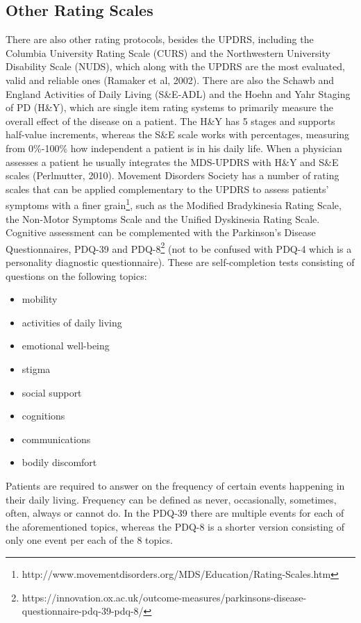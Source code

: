 
\subsection{Other Rating Scales}
\label{subsec:otherScales}
There are also other rating protocols, besides the \gls{UPDRS}, including the Columbia University Rating Scale (CURS) and the Northwestern University Disability Scale (NUDS), which along with the \gls{UPDRS} are the most evaluated, valid and reliable ones (Ramaker et al, 2002). There are also the Schawb and England Activities of Daily Living (S\&E-ADL) and the Hoehn and Yahr Staging of \gls{PD} (H\&Y), which are single item rating systems to primarily measure the overall effect of the disease on a patient. The H\&Y has 5 stages and supports half-value increments, whereas the S\&E scale works with percentages, measuring from 0\%-100\% how independent a patient is in his daily life. When a physician assesses a patient he usually integrates the MDS-\gls{UPDRS} with H\&Y and S\&E scales (Perlmutter, 2010). Movement Disorders Society has a number of rating scales that can be applied complementary to the \gls{UPDRS} to assess patients' symptoms with a finer grain\footnote{http://www.movementdisorders.org/MDS/Education/Rating-Scales.htm}, such as the Modified Bradykinesia Rating Scale, the Non-Motor Symptoms Scale and the Unified Dyskinesia Rating Scale.
Cognitive assessment can be complemented with the Parkinson's Disease Questionnaires, PDQ-39 and PDQ-8\footnote{https://innovation.ox.ac.uk/outcome-measures/parkinsons-disease-questionnaire-pdq-39-pdq-8/} (not to be confused with PDQ-4 which is a personality diagnostic questionnaire). These are self-completion tests consisting of questions on the following topics:
\begin{itemize}
\item mobility
\item activities of daily living
\item emotional well-being
\item stigma
\item social support
\item cognitions
\item communications
\item bodily discomfort
\end{itemize}

Patients are required to answer on the frequency of certain events happening in their daily living. Frequency can be defined as never, occasionally, sometimes, often, always or cannot do. In the PDQ-39 there are multiple events for each of the aforementioned topics, whereas the PDQ-8 is a shorter version consisting of only one event per each of the 8 topics.

